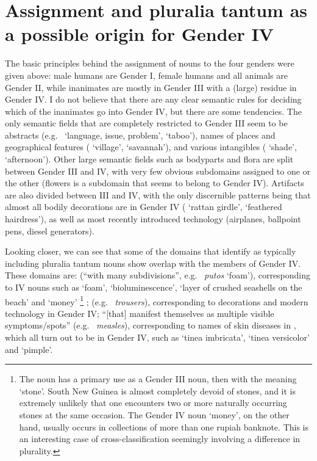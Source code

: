\documentclass[output=collectionpaper]{langsci/langscibook}
\begin{document}
\section{Assignment and pluralia tantum as a possible origin for Gender IV}
\label{sec:Bruno:Mar-assignment}
The basic principles behind the assignment of nouns to the four genders were given above: male humans are Gender I, female humans and all animals are Gender II, while inanimates are mostly in Gender III with a (large) residue in Gender IV. I do not believe that there are any clear semantic rules for deciding which of the inanimates go into Gender IV, but there are some tendencies. The only semantic fields that are completely restricted to Gender III seem to be abstracts (e.g.\  `language, issue, problem',  `taboo'), names of places and geographical features ( `village',  `savannah'), and various intangibles ( `shade',  `afternoon'). Other large semantic fields such as bodyparts and flora are split between Gender III and IV, with very few obvious subdomains assigned to one or the other (flowers is a subdomain that seems to belong to Gender IV). Artifacts are also divided between III and IV, with the only discernible patterns being that almost all bodily decorations are in Gender IV ( `rattan girdle',  `feathered hairdress'), as well as most recently introduced technology (airplanes, ballpoint pens, diesel generators).

Looking closer, we can see that some of the domains that \cite[630]{Koptjevskaja-Tamm2001} identify as typically including pluralia tantum nouns show overlap with the members of Gender IV. These domains are:  (``with many subdivisions'', e.g.\  \emph{putos} `foam'), corresponding to  IV nouns such as  `foam',  `bioluminescence',  `layer of crushed seashells on the beach' and  `money'%
\footnote{%
The noun  has a primary use as a Gender III noun, then with the meaning `stone'. South New Guinea is almost completely devoid of stones, and it is extremely unlikely that one encounters two or more naturally occurring stones at the same occasion. The Gender IV noun `money', on the other hand, usually occurs in collections of more than one rupiah banknote. This is an interesting case of cross-classification seemingly involving a difference in plurality.
}%
;  (e.g.\  \emph{trousers}), corresponding to  decorations and modern technology in Gender IV;  ``[that] manifest themselves as multiple visible symptoms/spots'' (e.g.\  \emph{measles}), corresponding to names of skin diseases in , which all turn out to be in Gender IV, such as  `tinea imbricata',  `tinea versicolor' and  `pimple'.
\end{document}
